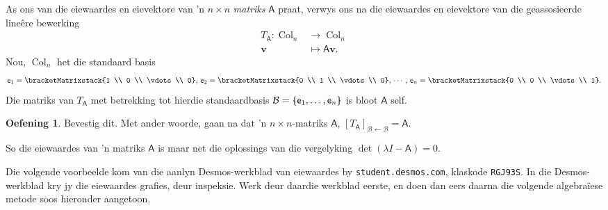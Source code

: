 \documentclass[a4paper,11pt]{book}
\theoremstyle{definition}
\newtheorem{exercise}{Oefening}
\newcommand{\ve}[1]{\mathbf{#1}}
\newcommand{\mat}[1]{\mathsf{#1}}
\newcommand{\basis}[1]{{\mathcal #1}}
\newcommand{\cmatrix}[1]{\bracketMatrixstack{#1}}
\newcommand{\bmark}{\raisebox{.53ex}{\rule{.2em}{.1ex}}}
\newcommand{\bopen}{{\protect\ooalign{\{\cr\hfil\bmark\hfil\cr}}}
\newcommand{\bclose}{{\protect\ooalign{\}\cr\hfil\bmark\hfil\cr}}}
\DeclareMathOperator{\Col}{Col}
\begin{document}
As ons van die eiewaardes en eievektore van 'n $n\times n$ \emph{matriks}
$\mat{A}$ praat, verwys ons na die eiewaardes en eievektore van die
geassosieerde line{\^e}re bewerking
\begin{align*}
	T_{\mat{A}} : \Col_n &\rightarrow \Col_n \\
	\ve{v} & \mapsto \mat{A} \ve{v} . 
\end{align*}
Nou, $\Col_n$ het die standaard basis
\[
	\mat{e}_1 = \cmatrix{1 \\ 0  \\ \vdots \\ 0}, \, 
	\mat{e}_2 = \cmatrix{0 \\ 1 \\ \vdots \\ 0}, \, 
	\cdots \, , \, 
	\mat{e}_n = \cmatrix{0 \\ 0 \\ \vdots \\ 1}. 
\]
Die matriks van $T_{\mat{A}}$ met betrekking tot hierdie standaardbasis
$\basis{B} = \bopen \mat{e}_1, \ldots, \mat{e}_n \bclose$ is bloot
$\mat{A}$ self.
\begin{exercise} Bevestig dit. Met ander woorde, gaan na dat 'n $n \times
	n$-matriks $\mat{A}$, $[T_{\mat{A}}]_{\basis{B} \leftarrow \basis{B}} =
	\mat{A}$.
\end{exercise} 
So die eiewaardes van 'n matriks $\mat{A}$ is maar net die oplossings van
die vergelyking $\det (\lambda I - \mat{A}) = 0$.


Die volgende voorbeelde kom van die aanlyn Desmos-werkblad van eiewaardes
by \texttt{student.desmos.com}, klaskode \texttt{RGJ93S}. In die
Desmos-werkblad kry jy die eiewaardes grafies, deur inspeksie. Werk deur
daardie werkblad eerste, en doen dan eers daarna die volgende
algebra{\"i}ese metode soos hieronder aangetoon.
\end{document}
